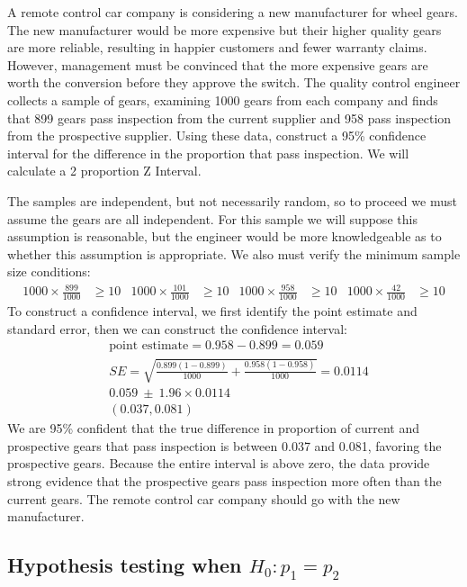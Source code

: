 \begin{example}{A remote control car company is considering a new manufacturer for wheel gears. The new manufacturer would be more expensive but their higher quality gears are more reliable, resulting in happier customers and fewer warranty claims. However, management must be convinced that the more expensive gears are worth the conversion before they approve the switch. The quality control engineer collects a sample of gears, examining 1000 gears from each company and finds that 899 gears pass inspection from the current supplier and 958 pass inspection from the prospective supplier. Using these data, construct a 95\% confidence interval for the difference in the proportion that pass inspection.}
We will calculate a 2 proportion Z Interval.

The samples are independent, but not necessarily random, so to proceed we must assume the gears are all independent. For this sample we will suppose this assumption is reasonable, but the engineer would be more knowledgeable as to whether this assumption is appropriate. We also must verify the minimum sample size conditions:
\begin{align*}
1000 \times \frac{899}{1000} &\ge 10
	&1000 \times \frac{101}{1000} &\ge 10
	&1000 \times \frac{958}{1000} &\ge 10
	&1000 \times \frac{42}{1000} &\ge 10
\end{align*}
To construct a confidence interval, we first identify the point estimate and standard error, then we can construct the confidence interval:
\begin{align*}
&\text{point estimate} = 0.958 - 0.899 = 0.059 \\
&SE = \sqrt{\frac{0.899(1-0.899)}{1000} +
			\frac{0.958(1-0.958)}{1000}}
	= 0.0114 \\
&0.059\ \pm\ 1.96 \times 0.0114 \\
&(0.037, 0.081)
\end{align*}
We are 95\% confident that the true difference in proportion of current and prospective gears that pass inspection is between 0.037 and 0.081, favoring the prospective gears. Because the entire interval is above zero, the data provide strong evidence that the prospective gears pass inspection more often than the current gears. The remote control car company should go with the new manufacturer.
\end{example}


\subsection{Hypothesis testing when $H_0: p_1 = p_2$}
\label{pooledHTForProportionsSection}


